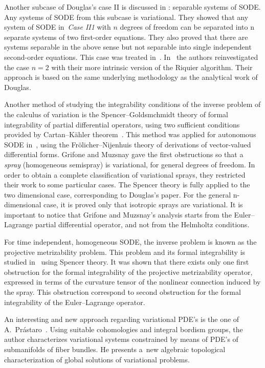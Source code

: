 \documentclass[pdftex]{sigma}
\begin{document}
Another subcase of Douglas's case II is discussed in \cite{Cr-Pr-Sa-Th-sep}:
separable systems of SODE. Any systems of SODE from this subcase is
variational. They showed that any system of SODE in~\emph{Case II1}
with $n$ degrees of freedom can be separated into n separate systems
of two f\/irst-order equations. They also proved that there are systems
separable in the above sense but not separable into single independent
second-order equations. This case was treated in~\cite{cantrijn96}.
In~\cite{sarlet02} the authors reinvestigated the case $n=2$ with
their more intrinsic version of the Riquier algorithm. Their approach
is based on the same underlying methodology as the analytical work
of Douglas.

Another method of studying the integrability conditions of the inverse
problem of the calculus of variation is the Spencer--Goldsmchmidt theory
of formal integrability of partial dif\/ferential operators, using two
suf\/f\/icient conditions provided by Cartan--K\"ahler theorem~\cite{Cartan,Gold,Spencer}.
This method was applied for autonomous SODE in~\cite{grifone00},
using the Fr\"olicher--Nijenhuis theory of derivations of vector-valued
dif\/ferential forms. Grifone and Muzsnay gave the f\/irst obstructions
so that a \emph{spray} (homogeneous semispray) is variational, for
general degrees of freedom. In order to obtain a complete classif\/ication
of variational sprays, they restricted their work to some particular
cases. The Spencer theory is fully applied to the two dimensional
case, corresponding to Douglas's paper. For the general n-dimensional
case, it is proved only that isotropic sprays are variational. It
is important to notice that Grifone and Muzsnay's analysis starts
from the Euler--Lagrange partial dif\/ferential operator, and not from
the Helmholtz conditions.

For time independent, homogeneous SODE, the inverse problem is known
as the projective metrizability problem. This problem and its formal
integrability is studied in~\cite{B-M_arxiv} using Spencer theory.
It was shown that there exists only one f\/irst obstruction for the
formal integrability of the projective metrizability operator, expressed
in terms of the curvature tensor of the nonlinear connection induced
by the spray. This obstruction correspond to second obstruction for
the formal integrability of the Euler--Lagrange operator.

An interesting and new approach regarding variational PDE's is the
one of A.~Pr\'asta\-ro~\mbox{\cite{Prast.99,Prast.06}}. Using suitable cohomologies
and integral bordism groups, the author characterizes variational
systems constrained by means of PDE's of submanifolds of f\/iber bundles.
He presents a~new algebraic topological characterization of global
solutions of variational problems.
\end{document}
